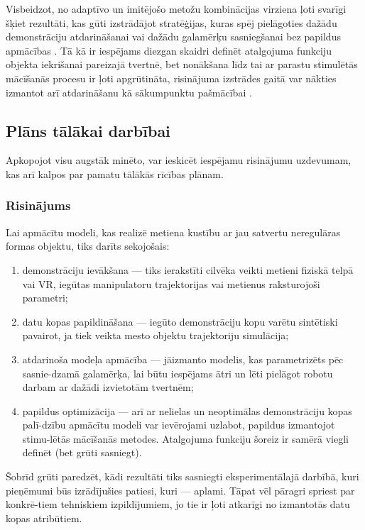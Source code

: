 \documentclass[12pt, a4paper]{article}
\numberwithin{equation}{section} %
\begin{document}
Visbeidzot, no adaptīvo un imitējošo metožu kombinācijas virziena ļoti svarīgi šķiet rezultāti, kas gūti izstrādājot stratēģijas, kuras spēj pielāgoties dažādu demonstrāciju atdarināšanai \cite{duan2017one} vai dažādu galamērķu sasniegšanai bez papildus apmācības \cite{lynch2020learning,lynch2021language,gupta2019relay}. Tā kā ir iespējams diezgan skaidri definēt atalgojuma funkciju objekta iekrišanai pareizajā tvertnē, bet nonākšana līdz tai ar parastu stimulētās mācīšanās procesu ir ļoti apgrūtināta, risinājuma izstrādes gaitā var nākties izmantot arī atdarināšanu kā sākumpunktu pašmācībai \cite{hester2018deep}. 



\subsection{Plāns tālākai darbībai}

Apkopojot visu augstāk minēto, var ieskicēt iespējamu risinājumu uzdevumam, kas arī kalpos par pamatu tālākās rīcības plānam. 

\subsubsection{Risinājums}

Lai apmācītu modeli, kas realizē metiena kustību ar jau satvertu neregulāras formas objektu, tiks darīts sekojošais:

\begin{enumerate}
    \item demonstrāciju ievākšana --- tiks ierakstīti cilvēka veikti metieni fiziskā telpā vai VR, iegūtas manipulatoru trajektorijas vai metienus raksturojoši parametri;
    \item datu kopas papildināšana --- iegūto demonstrāciju kopu varētu sintētiski pavairot, ja tiek veikta mesto objektu trajektoriju simulācija;
    \item atdarinoša modeļa apmācība --- jāizmanto modelis, kas parametrizēts pēc sasnie-dzamā galamērķa, lai būtu iespējams ātri un lēti pielāgot robotu darbam ar dažādi izvietotām tvertnēm;
    \item papildus optimizācija --- arī ar nelielas un neoptimālas demonstrāciju kopas palī-dzību apmācītu modeli var ievērojami uzlabot, papildus izmantojot stimu-lētās mācīšanās metodes. Atalgojuma funkciju šoreiz ir samērā viegli definēt (bet grūti sasniegt).
\end{enumerate}

Šobrīd grūti paredzēt, kādi rezultāti tiks sasniegti eksperimentālajā darbībā, kuri pieņēmumi būs izrādījušies patiesi, kuri --- aplami. Tāpat vēl pāragri spriest par konkrē-tiem tehniskiem izpildījumiem, jo tie ir ļoti atkarīgi no izmantotās datu kopas atribūtiem.
\end{document}
